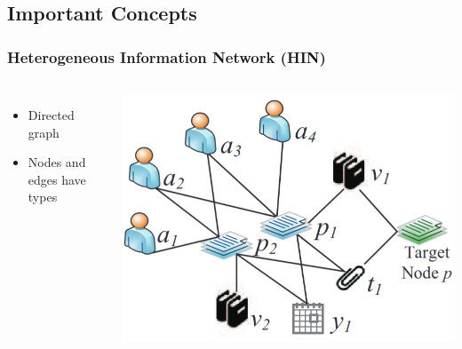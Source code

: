 \subsection{Important Concepts}
\begin{frame}
\frametitle{Heterogeneous Information Network (HIN)}
\begin{columns}

\begin{itemize}
    \item Directed graph
    \item Nodes and edges have types
\end{itemize}

\includegraphics[width=1\linewidth]{img/hin}


\end{columns}
\end{frame}
